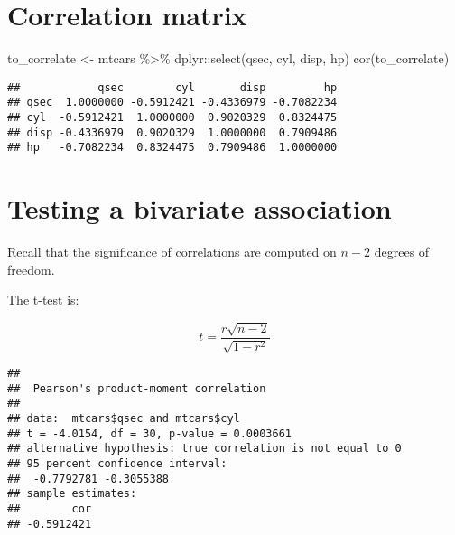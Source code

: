 \documentclass[
]{book}
\newenvironment{Shaded}{\begin{snugshade}}{\end{snugshade}}
\newcommand{\FunctionTok}[1]{\textcolor[rgb]{0.00,0.00,0.00}{#1}}
\newcommand{\NormalTok}[1]{#1}
\newcommand{\OtherTok}[1]{\textcolor[rgb]{0.56,0.35,0.01}{#1}}
\newcommand{\SpecialCharTok}[1]{\textcolor[rgb]{0.00,0.00,0.00}{#1}}
\begin{document}
\hypertarget{correlation-matrix}{%
\section{Correlation matrix}\label{correlation-matrix}}

\begin{Shaded}
\begin{Highlighting}[]
\NormalTok{to\_correlate }\OtherTok{\textless{}{-}}\NormalTok{ mtcars }\SpecialCharTok{\%\textgreater{}\%}\NormalTok{ dplyr}\SpecialCharTok{::}\FunctionTok{select}\NormalTok{(qsec, cyl, disp, hp)}
\FunctionTok{cor}\NormalTok{(to\_correlate)}
\end{Highlighting}
\end{Shaded}

\begin{verbatim}
##            qsec        cyl       disp         hp
## qsec  1.0000000 -0.5912421 -0.4336979 -0.7082234
## cyl  -0.5912421  1.0000000  0.9020329  0.8324475
## disp -0.4336979  0.9020329  1.0000000  0.7909486
## hp   -0.7082234  0.8324475  0.7909486  1.0000000
\end{verbatim}

\hypertarget{testing-a-bivariate-association}{%
\section{Testing a bivariate association}\label{testing-a-bivariate-association}}

Recall that the significance of correlations are computed on \(n - 2\) degrees of freedom.

The t-test is:

\[
t = \frac{r \sqrt{n - 2}}{\sqrt{1 - r^2}}
\]

\begin{Shaded}
\end{Shaded}

\begin{verbatim}
## 
##  Pearson's product-moment correlation
## 
## data:  mtcars$qsec and mtcars$cyl
## t = -4.0154, df = 30, p-value = 0.0003661
## alternative hypothesis: true correlation is not equal to 0
## 95 percent confidence interval:
##  -0.7792781 -0.3055388
## sample estimates:
##        cor 
## -0.5912421
\end{verbatim}
\end{document}
